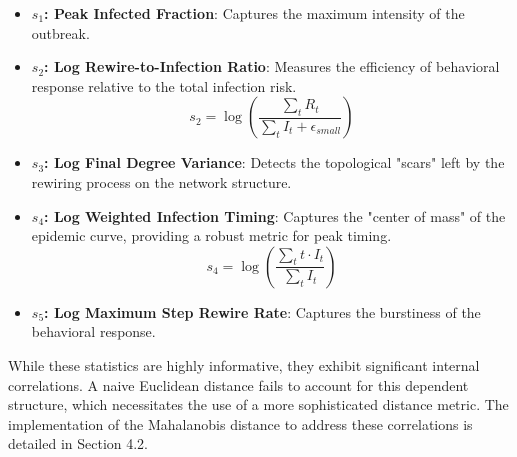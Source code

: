 \begin{itemize}
    \item \textbf{$s_1$: Peak Infected Fraction}: Captures the maximum intensity of the outbreak.
    \item \textbf{$s_2$: Log Rewire-to-Infection Ratio}: Measures the efficiency of behavioral response relative to the total infection risk.
    \[ s_2 = \log \left( \frac{\sum_{t} R_t}{\sum_{t} I_t + \epsilon_{small}} \right) \]
    \item \textbf{$s_3$: Log Final Degree Variance}: Detects the topological "scars" left by the rewiring process on the network structure.
    \item \textbf{$s_4$: Log Weighted Infection Timing}: Captures the "center of mass" of the epidemic curve, providing a robust metric for peak timing.
    \[ s_4 = \log \left( \frac{\sum_{t} t \cdot I_t}{\sum_{t} I_t} \right) \]
    \item \textbf{$s_5$: Log Maximum Step Rewire Rate}: Captures the burstiness of the behavioral response.
\end{itemize}

While these statistics are highly informative, they exhibit significant internal correlations.
A naive Euclidean distance fails to account for this dependent structure, which necessitates the use of a more sophisticated distance metric.
The implementation of the Mahalanobis distance to address these correlations is detailed in Section 4.2.


